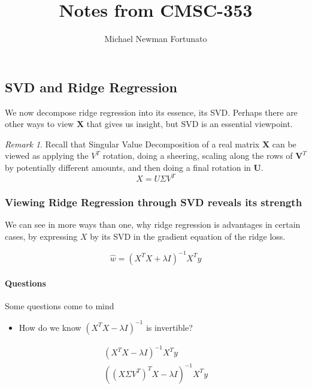 \documentclass[10pt, letterpaper]{article}
\theoremstyle{definition}
\theoremstyle{remark}
\newtheorem*{remark}{Remark}
\begin{document}
\title{Notes from CMSC-353}
\author{Michael Newman Fortunato}
\maketitle

\subsection{SVD and Ridge Regression}
We now decompose ridge regression into its essence, its SVD.
Perhaps there are other ways to view $\mathbf{X}$ that gives us insight,
but SVD is an essential viewpoint.

\begin{remark}
   Recall that Singular Value Decomposition of a real matrix $\mathbf{X}$
   can be viewed as applying the $V^{T}$ rotation, doing a sheering, 
   scaling along the rows of $\mathbf{V}^{T}$ by potentially different 
   amounts, and then doing a final rotation in $\mathbf{U}$.
   \[ X = U \Sigma V^{T} \]
\end{remark}

\subsubsection{Viewing Ridge Regression through SVD reveals its strength}

We can see in more ways than one, why ridge regression is advantages in certain
cases, by expressing $X$ by its SVD in the gradient equation of the ridge loss.

\begin{equation}
    \hat w = \left(X^{T}X + \lambda I \right)^{-1}X^{T}y
\end{equation}

\paragraph{Questions}
Some questions come to mind 
\begin{itemize}
  \item How do we know $\left(X^{T}X - \lambda I\right)^{-1}$ is invertible?
\end{itemize}

\newcommand{\svd}[0]{X \Sigma V^T}

\begin{align*}
    \left(X^{T}X - \lambda I\right)^{-1}X^{T}y  \\
    \left(\left(\svd\right)^{T}X - \lambda I\right)^{-1}X^{T}y 
\end{align*}


  
\end{document}
